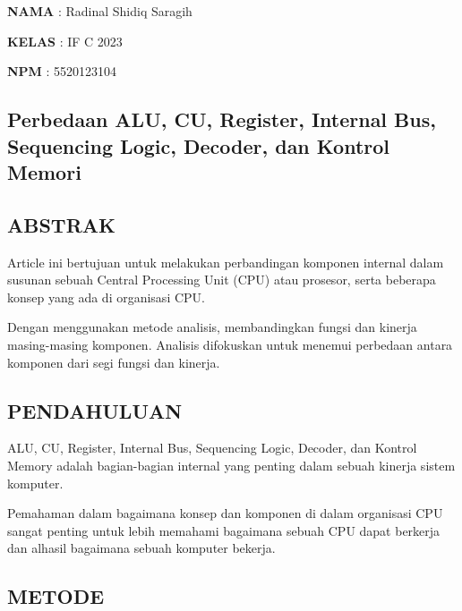 \documentclass[12pt,a4paper]{article}
\begin{document}
  \textbf{NAMA} : Radinal Shidiq Saragih

  \textbf{KELAS} : IF C 2023

  \textbf{NPM} : 5520123104

  \vspace {0.25cm}

    \begin{center}
      \section*{\textbf{Perbedaan ALU, CU, Register, Internal Bus,
      Sequencing Logic, Decoder, dan Kontrol Memori}}
    \end{center}

  \vspace {0.25cm}

  \begin{center}
    \subsection*{\textbf{ABSTRAK}}
  \end{center}

  Article ini bertujuan untuk melakukan perbandingan komponen internal
  dalam susunan sebuah Central Processing Unit (CPU) atau prosesor,
  serta beberapa konsep yang ada di organisasi CPU.

  Dengan menggunakan metode analisis, membandingkan fungsi dan kinerja
  masing-masing komponen. Analisis difokuskan untuk menemui perbedaan
  antara komponen dari segi fungsi dan kinerja.

  \begin{center}
    \subsection*{\textbf{PENDAHULUAN}}
  \end{center}

  \vspace {0.25cm}

      ALU, CU, Register, Internal Bus, Sequencing Logic, Decoder, dan Kontrol
      Memory adalah bagian-bagian internal yang penting dalam sebuah
      kinerja sistem komputer.

      Pemahaman dalam bagaimana konsep dan komponen di dalam organisasi CPU
      sangat penting untuk lebih memahami bagaimana sebuah CPU dapat berkerja
      dan alhasil bagaimana sebuah komputer bekerja.

  \begin{center}
    \subsection*{\textbf{METODE}}
  \end{center}
\end{document}
